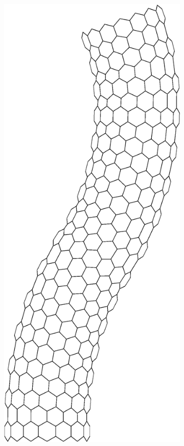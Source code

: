 \begin{figure}[t!]
		\centering
		\begin{subfigure}[t]{.33\textwidth}
			\centering
			\includegraphics[scale=.25]{./fig/ch1/Nanotube.eps}

\end{subfigure}
\end{figure}
